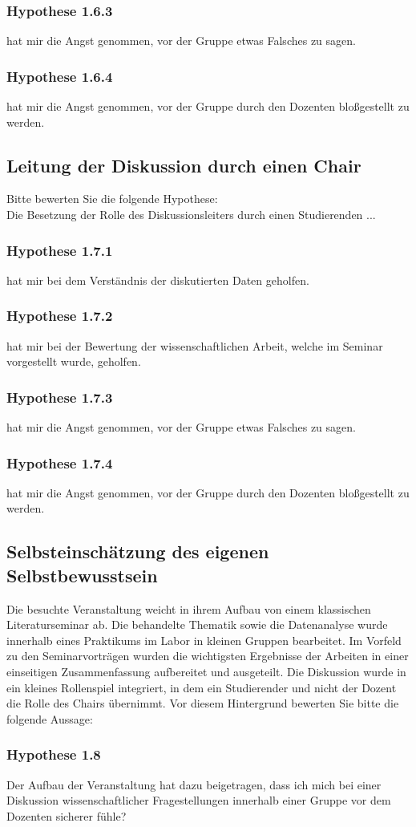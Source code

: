 \subsubsection*{Hypothese 1.6.3}
hat mir die Angst genommen, vor der Gruppe etwas Falsches zu sagen.
\subsubsection*{Hypothese 1.6.4}
hat mir die Angst genommen, vor der Gruppe durch den Dozenten bloßgestellt zu werden.


\subsection*{Leitung der Diskussion durch einen Chair}
Bitte bewerten Sie die folgende Hypothese:\\
\noindent
Die Besetzung der Rolle des Diskussionsleiters durch einen Studierenden ...
\subsubsection*{Hypothese 1.7.1}
hat mir bei dem Verständnis der diskutierten Daten geholfen.
\subsubsection*{Hypothese 1.7.2}
hat mir bei der Bewertung der wissenschaftlichen Arbeit, welche im Seminar vorgestellt wurde, geholfen.
\subsubsection*{Hypothese 1.7.3}
hat mir die Angst genommen, vor der Gruppe etwas Falsches zu sagen.
\subsubsection*{Hypothese 1.7.4}
hat mir die Angst genommen, vor der Gruppe durch den Dozenten bloßgestellt zu werden.

\subsection*{Selbsteinschätzung des eigenen Selbstbewusstsein}
Die besuchte Veranstaltung weicht in ihrem Aufbau von einem klassischen Literaturseminar ab. Die behandelte Thematik sowie die Datenanalyse wurde innerhalb eines Praktikums im Labor in kleinen Gruppen bearbeitet. Im Vorfeld zu den Seminarvorträgen wurden die wichtigsten Ergebnisse der Arbeiten in einer einseitigen Zusammenfassung aufbereitet und ausgeteilt.
Die Diskussion wurde in ein kleines Rollenspiel integriert, in dem ein Studierender und nicht der Dozent die Rolle des Chairs übernimmt. Vor diesem Hintergrund bewerten Sie bitte die folgende Aussage:

\subsubsection*{Hypothese 1.8}
Der Aufbau der Veranstaltung hat dazu beigetragen, dass ich mich bei einer Diskussion wissenschaftlicher Fragestellungen innerhalb einer Gruppe vor dem Dozenten sicherer fühle?
